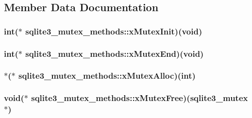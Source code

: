 \subsection{Member Data Documentation}
\hypertarget{structsqlite3__mutex__methods_f0a78d79b6029444d4a2ac7c474030d4}{
\subsubsection[xMutexInit]{\setlength{\rightskip}{0pt plus 5cm}int($\ast$ {\bf sqlite3\_\-mutex\_\-methods::xMutexInit})(void)}}
\label{structsqlite3__mutex__methods_f0a78d79b6029444d4a2ac7c474030d4}


\hypertarget{structsqlite3__mutex__methods_4963efb4bfede244d4d2a14510dbfe68}{
\subsubsection[xMutexEnd]{\setlength{\rightskip}{0pt plus 5cm}int($\ast$ {\bf sqlite3\_\-mutex\_\-methods::xMutexEnd})(void)}}
\label{structsqlite3__mutex__methods_4963efb4bfede244d4d2a14510dbfe68}


\hypertarget{structsqlite3__mutex__methods_6c99ad4448a6c269f80074e6645eb4a6}{
\subsubsection[xMutexAlloc]{$\ast$($\ast$ {\bf sqlite3\_\-mutex\_\-methods::xMutexAlloc})(int)}}
\label{structsqlite3__mutex__methods_6c99ad4448a6c269f80074e6645eb4a6}


\hypertarget{structsqlite3__mutex__methods_4e58d446a7225ce91073eb0af91d219a}{
\subsubsection[xMutexFree]{\setlength{\rightskip}{0pt plus 5cm}void($\ast$ {\bf sqlite3\_\-mutex\_\-methods::xMutexFree})({\bf sqlite3\_\-mutex} $\ast$)}}
\label{structsqlite3__mutex__methods_4e58d446a7225ce91073eb0af91d219a}



